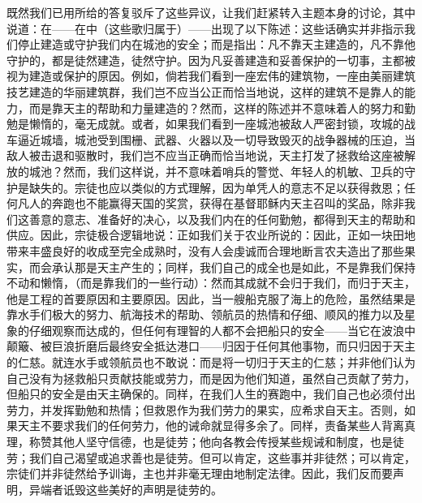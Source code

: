 既然我们已用所给的答复驳斥了这些异议，让我们赶紧转入主题本身的讨论，其中说道：在——在中（这些歌归属于）——出现了以下陈述：这些话确实并非指示我们停止建造或守护我们内在城池的安全；而是指出：凡不靠天主建造的，凡不靠他守护的，都是徒然建造，徒然守护。因为凡妥善建造和妥善保护的一切事，主都被视为建造或保护的原因。例如，倘若我们看到一座宏伟的建筑物，一座由美丽建筑技艺建造的华丽建筑群，我们岂不应当公正而恰当地说，这样的建筑不是靠人的能力，而是靠天主的帮助和力量建造的？然而，这样的陈述并不意味着人的努力和勤勉是懒惰的，毫无成就。或者，如果我们看到一座城池被敌人严密封锁，攻城的战车逼近城墙，城池受到围栅、武器、火器以及一切导致毁灭的战争器械的压迫，当敌人被击退和驱散时，我们岂不应当正确而恰当地说，天主打发了拯救给这座被解放的城池？然而，我们这样说，并不意味着哨兵的警觉、年轻人的机敏、卫兵的守护是缺失的。宗徒也应以类似的方式理解，因为单凭人的意志不足以获得救恩；任何凡人的奔跑也不能赢得天国的奖赏，获得在基督耶稣内天主召叫的奖品，除非我们这善意的意志、准备好的决心，以及我们内在的任何勤勉，都得到天主的帮助和供应。因此，宗徒极合逻辑地说：正如我们关于农业所说的：因此，正如一块田地带来丰盛良好的收成至完全成熟时，没有人会虔诚而合理地断言农夫造出了那些果实，而会承认那是天主产生的；同样，我们自己的成全也是如此，不是靠我们保持不动和懒惰，（而是靠我们的一些行动）：然而其成就不会归于我们，而归于天主，他是工程的首要原因和主要原因。因此，当一艘船克服了海上的危险，虽然结果是靠水手们极大的努力、航海技术的帮助、领航员的热情和仔细、顺风的推力以及星象的仔细观察而达成的，但任何有理智的人都不会把船只的安全——当它在波浪中颠簸、被巨浪折磨后最终安全抵达港口——归因于任何其他事物，而只归因于天主的仁慈。就连水手或领航员也不敢说：而是将一切归于天主的仁慈；并非他们认为自己没有为拯救船只贡献技能或劳力，而是因为他们知道，虽然自己贡献了劳力，但船只的安全是由天主确保的。同样，在我们人生的赛跑中，我们自己也必须付出劳力，并发挥勤勉和热情；但救恩作为我们劳力的果实，应希求自天主。否则，如果天主不要求我们的任何劳力，他的诫命就显得多余了。同样，责备某些人背离真理，称赞其他人坚守信德，也是徒劳；他向各教会传授某些规诫和制度，也是徒劳；我们自己渴望或追求善也是徒劳。但可以肯定，这些事并非徒然；可以肯定，宗徒们并非徒然给予训诲，主也并非毫无理由地制定法律。因此，我们反而要声明，异端者诋毁这些美好的声明是徒劳的。\par

